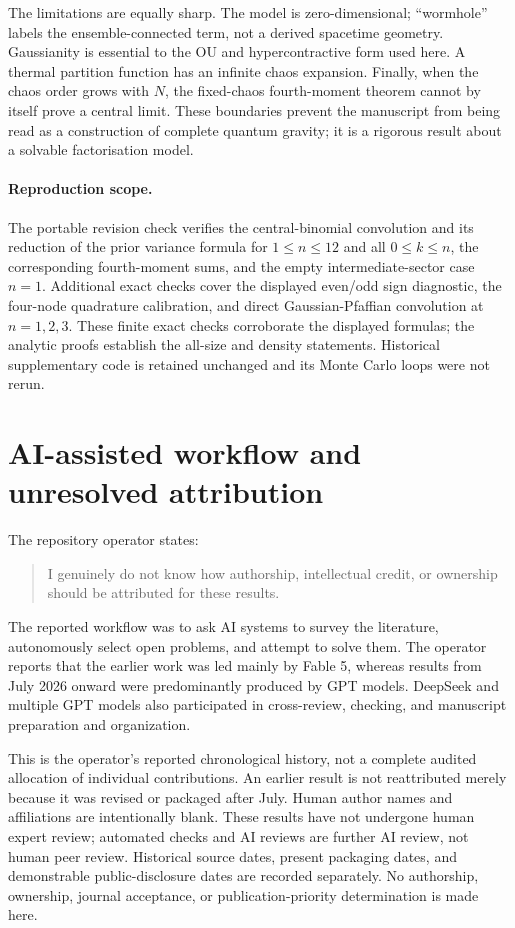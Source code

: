 \documentclass[11pt,a4paper]{article}
\theoremstyle{definition}
\theoremstyle{remark}
\begin{document}
The limitations are equally sharp.  The model is zero-dimensional; ``wormhole'' labels the
ensemble-connected term, not a derived spacetime geometry.  Gaussianity is essential to the
OU and hypercontractive form used here.  A thermal partition function has an infinite chaos
expansion.  Finally, when the chaos order grows with $N$, the fixed-chaos fourth-moment
theorem cannot by itself prove a central limit.  These boundaries prevent the manuscript
from being read as a construction of complete quantum gravity; it is a rigorous result about
a solvable factorisation model.

\paragraph{Reproduction scope.}
The portable revision check verifies the central-binomial convolution and its reduction
of the prior variance formula for $1\le n\le12$ and all $0\le k\le n$, the corresponding
fourth-moment sums, and the empty intermediate-sector case $n=1$.
Additional exact checks cover the displayed even/odd sign diagnostic, the four-node
quadrature calibration, and direct Gaussian-Pfaffian convolution at $n=1,2,3$.
These finite exact checks corroborate the displayed formulas; the analytic proofs establish
the all-size and density statements.
Historical supplementary code is retained unchanged and its Monte Carlo loops were not rerun.

\section*{AI-assisted workflow and unresolved attribution}
The repository operator states:
\begin{quote}
I genuinely do not know how authorship, intellectual credit, or ownership should be attributed for these results.
\end{quote}
The reported workflow was to ask AI systems to survey the literature,
autonomously select open problems, and attempt to solve them. The operator
reports that the earlier work was led mainly by Fable 5, whereas results from
July 2026 onward were predominantly produced by GPT models. DeepSeek and
multiple GPT models also participated in cross-review, checking, and
manuscript preparation and organization.

This is the operator's reported chronological history, not a complete audited
allocation of individual contributions. An earlier result is not reattributed
merely because it was revised or packaged after July. Human author names and
affiliations are intentionally blank. These results have not undergone human
expert review; automated checks and AI reviews are further AI review, not human
peer review. Historical source dates, present packaging dates, and demonstrable
public-disclosure dates are recorded separately. No authorship, ownership,
journal acceptance, or publication-priority determination is made here.



\end{document}
